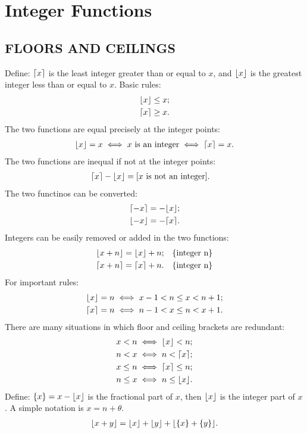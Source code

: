 \documentclass{article}
\DeclarePairedDelimiter\ceil{\lceil}{\rceil}
\DeclarePairedDelimiter\floor{\lfloor}{\rfloor}
\begin{document}
\setcounter{section}{2}
\section{Integer Functions}
\subsection{FLOORS AND CEILINGS}
Define: $\ceil{x}$ is the least integer greater than or equal to $x$, and $\floor{x}$ is the greatest integer less than or equal to $x$.
Basic rules:
\begin{align}
\floor{x} &\le x; \\
\ceil{x} &\ge x.
\end{align}
The two functions are equal precisely at the integer points:
\begin{align}
\floor{x} = x \iff x \text{ is an integer} \iff \ceil{x} = x.
\end{align}
The two functions are inequal if not at the integer points:
\begin{align}
\ceil{x} - \floor{x} &= [x \text{ is not an integer}].
\end{align}
The two functinos can be converted:
\begin{align}
\ceil{-x} &= -\floor{x}; \\
\floor{-x} &= -\ceil{x}.
\end{align}
Integers can be easily removed or added in the two functions:
\begin{align}
\floor{x + n} &= \floor{x} + n; && \{\text{integer n}\} \\
\ceil{x + n} &= \ceil{x} + n. && \{\text{integer n}\}
\end{align}
For important rules:
\begin{align}
\floor{x} = n &\iff x-1 < n \le x < n+1;\\
\ceil{x} = n &\iff n-1 < x \le n < x + 1.
\end{align}
There are many situations in which floor and ceiling brackets are redundant:
\begin{align}
x < n &\iff \floor{x} < n;\\
n < x &\iff n < \ceil{x};\\
x \le n &\iff \ceil{x} \le n;\\
n \le x &\iff n \le \floor{x}.
\end{align}
Define: $\{x\} = x - \floor{x}$ is the fractional part of $x$, then $\floor{x}$ is the integer part of $x$.
A simple notation is $x = n + \theta$.
\begin{align}
\floor{x + y} = \floor{x} + \floor{y} + \floor{\{x\} + \{y\}}.
\end{align}
\end{document}
